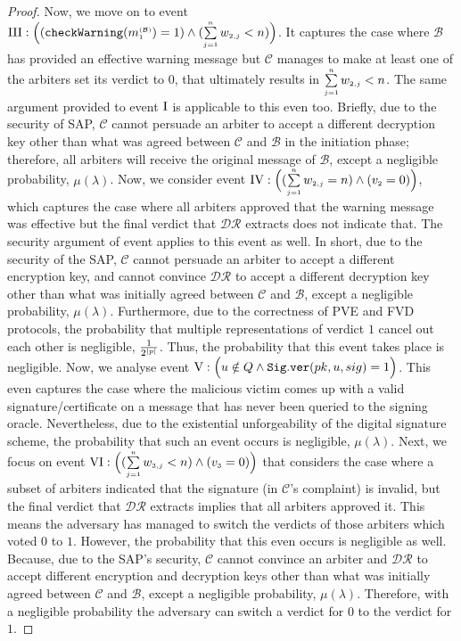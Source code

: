 \begin{proof}
 
 Now, we move on to event   $\text{\MakeUppercase{\romannumeral 3}}: \Big((\mathtt{checkWarning}(m^{\st\mathcal{(B)}}_{\st1})= 1) \wedge (\sum\limits_{\st j=1}^{\st n}w_{\st 2,j}< {n})\Big)$. It captures the case where $\mathcal{B}$ has provided an effective warning message but $\mathcal{C}$ manages to make at least one of the arbiters  set its verdict to $0$, that ultimately results in $\sum\limits_{\scriptscriptstyle j=1}^{\scriptscriptstyle n}w_{\scriptscriptstyle 2,j}< {n}$. The same argument provided to event $\text{\MakeUppercase{\romannumeral 1}}$ is applicable to this even too. Briefly, due to the security of SAP, $\mathcal{C}$ cannot persuade an arbiter to accept a different decryption key other than what was agreed between $\mathcal{C}$ and $\mathcal{B}$ in the initiation phase; therefore, all arbiters will receive the original message of $\mathcal{B}$, except a negligible probability, $\mu(\lambda)$. Now, we consider  event $\text{\MakeUppercase{\romannumeral 4}}:  \Big((\sum\limits_{\st j=1}^{\st n}w_{\st 2,j}= {n}) \wedge ({v}_{\st 2}=0)\Big)$, which captures the case where all arbiters  approved that the warning message was effective but   the final verdict that $\mathcal{DR}$
extracts does not indicate that. The security argument of  event  applies to this event as well. In short, due to the security of the SAP, $\mathcal{C}$ cannot persuade  an arbiter to accept a different encryption key, and cannot convince $\mathcal{DR}$ to accept a different decryption key other than what was initially agreed between $\mathcal{C}$ and $\mathcal{B}$, except a negligible probability, $\mu(\lambda)$. Furthermore, due to the correctness of PVE and FVD protocols,  the probability that multiple representations
of verdict $1$ cancel out each other is negligible, $\frac{1}{2^{\scriptscriptstyle |p|}}$. Thus, the probability that this event takes place is negligible. Now, we analyse event  $\text{\MakeUppercase{\romannumeral 5}}: \Big(u\notin Q \wedge\mathtt{Sig.ver}( pk, u, sig) =1\Big)$. This even captures the case where the malicious victim comes up with a valid signature/certificate on a message that has never been queried to the signing oracle.  Nevertheless, due to the existential unforgeability of the digital signature scheme, the probability that such an event occurs is negligible, $\mu(\lambda)$. Next, we focus on event
 $\text{\MakeUppercase{\romannumeral 6}}: \Big((\sum\limits_{\st j=1}^{\st n}w_{\st 3,j}< {n}) \wedge ( {v}_{\st 3}=0)\Big)$ that considers the case where a subset of arbiters indicated that the signature (in $\mathcal{C}$'s complaint) is invalid, but   the final verdict that $\mathcal{DR}$ extracts implies that all arbiters approved it. This means the adversary has managed to switch the verdicts of those arbiters which voted $0$ to $1$. However, the probability that this even occurs is negligible as well. Because, due to the SAP's security,  $\mathcal{C}$ cannot convince  an arbiter and $\mathcal{DR}$ to accept   different encryption and decryption keys other than what was initially agreed between $\mathcal{C}$ and $\mathcal{B}$, except a negligible probability, $\mu(\lambda)$.  Therefore, with a negligible probability the adversary can switch a verdict for $0$ to the verdict for $1$. 
 

\end{proof}
